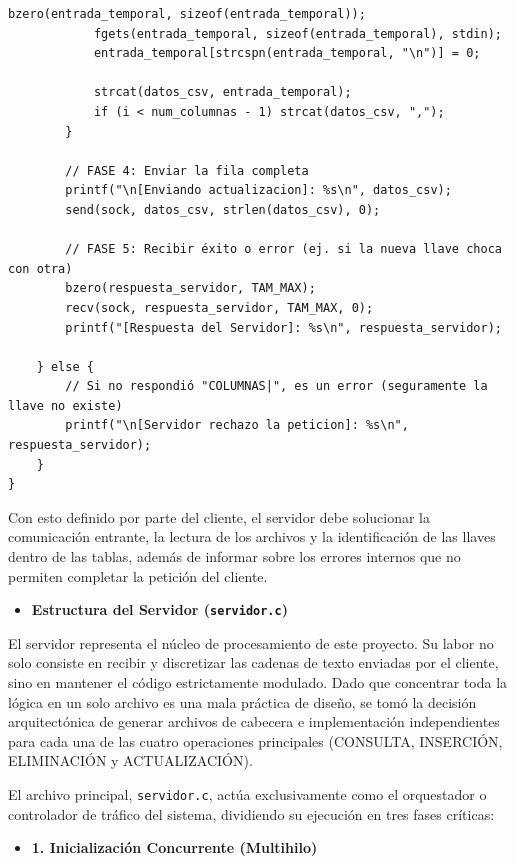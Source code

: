 \documentclass[12pt]{article}
\begin{document}
\begin{lstlisting}[style=estiloC ,title={Código 5. Cliente TCP (ACTUALIZACION)}]
            bzero(entrada_temporal, sizeof(entrada_temporal));
            fgets(entrada_temporal, sizeof(entrada_temporal), stdin);
            entrada_temporal[strcspn(entrada_temporal, "\n")] = 0;

            strcat(datos_csv, entrada_temporal); 
            if (i < num_columnas - 1) strcat(datos_csv, ",");
        }

        // FASE 4: Enviar la fila completa
        printf("\n[Enviando actualizacion]: %s\n", datos_csv);
        send(sock, datos_csv, strlen(datos_csv), 0);

        // FASE 5: Recibir éxito o error (ej. si la nueva llave choca con otra)
        bzero(respuesta_servidor, TAM_MAX);
        recv(sock, respuesta_servidor, TAM_MAX, 0);
        printf("[Respuesta del Servidor]: %s\n", respuesta_servidor);

    } else {
        // Si no respondió "COLUMNAS|", es un error (seguramente la llave no existe)
        printf("\n[Servidor rechazo la peticion]: %s\n", respuesta_servidor);
    }
}
\end{lstlisting}

Con esto definido por parte del cliente, el servidor debe solucionar la comunicación entrante, la lectura de los archivos y la identificación de las llaves dentro de las tablas, además de informar sobre los errores internos que no permiten completar la petición del cliente.

\begin{itemize}
    \item \textbf{Estructura del Servidor (\texttt{servidor.c})}
\end{itemize}

El servidor representa el núcleo de procesamiento de este proyecto. Su labor no solo consiste en recibir y discretizar las cadenas de texto enviadas por el cliente, sino en mantener el código estrictamente modulado. Dado que concentrar toda la lógica en un solo archivo es una mala práctica de diseño, se tomó la decisión arquitectónica de generar archivos de cabecera e implementación independientes para cada una de las cuatro operaciones principales (CONSULTA, INSERCIÓN, ELIMINACIÓN y ACTUALIZACIÓN).

El archivo principal, \texttt{servidor.c}, actúa exclusivamente como el orquestador o controlador de tráfico del sistema, dividiendo su ejecución en tres fases críticas:

\begin{itemize}[label=]
    \item \textbf{1. Inicialización Concurrente (Multihilo)}
\end{itemize}
\end{document}
